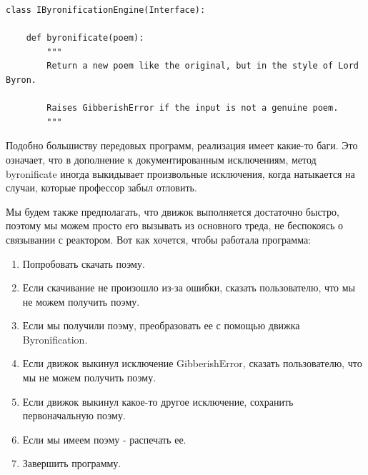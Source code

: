 \begin{scriptsize}\begin{verbatim}
class IByronificationEngine(Interface):

    def byronificate(poem):
        """
        Return a new poem like the original, but in the style of Lord Byron.

        Raises GibberishError if the input is not a genuine poem.
        """
\end{verbatim}\end{scriptsize}


Подобно большиству передовых программ, реализация 
имеет какие-то баги. Это означает, что в дополнение к 
документированным исключениям, метод byronificate иногда 
выкидывает произвольные исключения, когда натыкается на 
случаи, которые профессор забыл отловить.


Мы будем также предполагать, что движок выполняется достаточно 
быстро, поэтому мы можем просто его вызывать из основного треда, 
не беспокоясь о связывании с реактором. Вот как хочется, чтобы 
работала программа:

\begin{enumerate}

\item Попробовать скачать поэму.

\item Если скачивание не произошло из-за ошибки, сказать пользователю, 
что мы не можем получить поэму.

\item Если мы получили поэму, преобразовать ее с помощью движка Byronification.

\item Если движок выкинул исключение GibberishError, сказать 
пользователю, что мы не можем получить поэму.

\item Если движок выкинул какое-то другое исключение, 
сохранить первоначальную поэму.

\item Если мы имеем поэму - распечать ее.

\item Завершить программу.

\end{enumerate}


